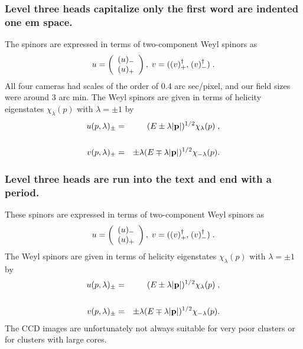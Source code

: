 
\subsubsection{Level three heads capitalize only the first word 
are indented one em space.}
The spinors are expressed in terms of two-component Weyl spinors as
\begin{equation}
   u=\left(\begin{array}{c}(u)_-\\(u)_+\end{array}\right),\;v={\bf 
   (}(v)^\dagger_+{\bf ,} \; (v)^\dagger_-{\bf )}\;.
\end{equation}
All four cameras had scales of the order of 0.4 arc sec/pixel, and our 
field sizes were around 3 arc min.  The Weyl spinors are given in terms 
of helicity eigen\-states $\chi_\lambda(p)$ with $\lambda=\pm1$ by
\begin{eqnarray}u(p, \lambda)_\pm & = & (E\pm\lambda|{\bf 
   p}|)^{1/2}\chi_\lambda(p)\;, \nonumber \\ & & \\v(p,\lambda)_\pm 
   & = & \pm\lambda(E\mp\lambda|{\bf p}|)^{1/2}\chi_{-\lambda}(p).
\nonumber\end{eqnarray}

\subsubsection{Level three heads are run into the text and end with a period.}
These spinors are expressed in terms of two-component Weyl spinors as
\begin{equation}
   u=\left(\begin{array}{c}(u)_-\\(u)_+\end{array}\right),\;v={\bf 
   (}(v)^\dagger_+{\bf ,} \; (v)^\dagger_-{\bf )}\;.
\end{equation}
The Weyl spinors are given in terms of helicity eigen\-states 
   $\chi_\lambda(p)$ with $\lambda=\pm1$ 
   by\begin{eqnarray}u(p, \lambda)_\pm & = & (E\pm\lambda|{\bf 
   p}|)^{1/2}\chi_\lambda(p)\;, \nonumber \\ & & \\v(p,\lambda)_\pm 
   & = & \pm\lambda(E\mp\lambda|{\bf p}|)^{1/2}\chi_{-\lambda}(p).
\nonumber\end{eqnarray}
The CCD images are unfortunately not always suitable for very poor 
clusters or for clusters with large cores.

